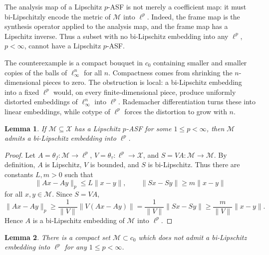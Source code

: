 \documentclass[11pt]{article}
\newtheorem{lemma}{Lemma}
\newcommand{\M}{\mathcal M}
\newcommand{\X}{\mathcal X}
\begin{document}
The analysis map of a Lipschitz \(p\)-ASF is not merely a coefficient map: it
must bi-Lipschitzly encode the metric of \(\M\) into \(\ell^p\). Indeed, the
frame map is the synthesis operator applied to the analysis map, and the frame
map has a Lipschitz inverse. Thus a subset with no bi-Lipschitz embedding into
any \(\ell^p\), \(p<\infty\), cannot have a Lipschitz \(p\)-ASF.

The counterexample is a compact bouquet in \(c_0\) containing smaller and
smaller copies of the balls of \(\ell_\infty^n\) for all \(n\). Compactness
comes from shrinking the \(n\)-dimensional pieces to zero. The obstruction is
local: a bi-Lipschitz embedding into a fixed \(\ell^p\) would, on every
finite-dimensional piece, produce uniformly distorted embeddings of
\(\ell_\infty^n\) into \(\ell^p\). Rademacher differentiation turns these into
linear embeddings, while cotype of \(\ell^p\) forces the distortion to grow
with \(n\).

\begin{lemma}\label{lem:asf-embeds}
If \(\M\subseteq\X\) has a Lipschitz \(p\)-ASF for some \(1\leq p<\infty\),
then \(\M\) admits a bi-Lipschitz embedding into \(\ell^p\).
\end{lemma}

\begin{proof}
Let \(A=\theta_f:\M\to\ell^p\), \(V=\theta_\tau:\ell^p\to\X\), and
\(S=VA:\M\to\M\). By definition, \(A\) is Lipschitz, \(V\) is bounded, and
\(S\) is bi-Lipschitz. Thus there are constants \(L,m>0\) such that
\[
  \|A x-A y\|_p\leq L\|x-y\|,\qquad
  \|Sx-Sy\|\geq m\|x-y\|
\]
for all \(x,y\in\M\). Since \(S=VA\),
\[
  \|A x-A y\|_p
  \geq \frac{1}{\|V\|}\|V(Ax-Ay)\|
  = \frac{1}{\|V\|}\|Sx-Sy\|
  \geq \frac{m}{\|V\|}\|x-y\|.
\]
Hence \(A\) is a bi-Lipschitz embedding of \(\M\) into \(\ell^p\).
\end{proof}

\begin{lemma}\label{lem:no-lp}
There is a compact set \(\M\subset c_0\) which does not admit a bi-Lipschitz
embedding into \(\ell^p\) for any \(1\leq p<\infty\).
\end{lemma}
\end{document}
